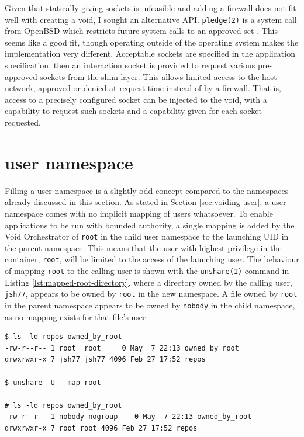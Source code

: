 \documentclass[12pt,a4paper,twoside]{report}
\begin{document}
Given that statically giving sockets is infeasible and adding a firewall does not fit well with creating a void, I sought an alternative API. \texttt{pledge(2)} is a system call from OpenBSD which restricts future system calls to an approved set \citep{the_openbsd_foundation_pledge2_2022}. This seems like a good fit, though operating outside of the operating system makes the implementation very different. Acceptable sockets are specified in the application specification, then an interaction socket is provided to request various pre-approved sockets from the shim layer. This allows limited access to the host network, approved or denied at request time instead of by a firewall. That is, access to a precisely configured socket can be injected to the void, with a capability to request such sockets and a capability given for each socket requested.

\section{user namespace}
\label{sec:filling-user}

Filling a user namespace is a slightly odd concept compared to the namespaces already discussed in this section. As stated in Section \ref{sec:voiding-user}, a user namespace comes with no implicit mapping of users whatsoever. To enable applications to be run with bounded authority, a single mapping is added by the Void Orchestrator of \texttt{root} in the child user namespace to the launching UID in the parent namespace. This means that the user with highest privilege in the container, \texttt{root}, will be limited to the access of the launching user. The behaviour of mapping \texttt{root} to the calling user is shown with the \texttt{unshare(1)} command in Listing \ref{lst:mapped-root-directory}, where a directory owned by the calling user, \texttt{jsh77}, appears to be owned by \texttt{root} in the new namespace. A file owned by \texttt{root} in the parent namespace appears to be owned by \texttt{nobody} in the child namespace, as no mapping exists for that file's user.

\begin{lstlisting}[float,label={lst:mapped-root-directory}]
$ ls -ld repos owned_by_root
-rw-r--r-- 1 root  root     0 May  7 22:13 owned_by_root
drwxrwxr-x 7 jsh77 jsh77 4096 Feb 27 17:52 repos

$ unshare -U --map-root

# ls -ld repos owned_by_root
-rw-r--r-- 1 nobody nogroup    0 May  7 22:13 owned_by_root
drwxrwxr-x 7 root root 4096 Feb 27 17:52 repos
\end{lstlisting}
\end{document}
